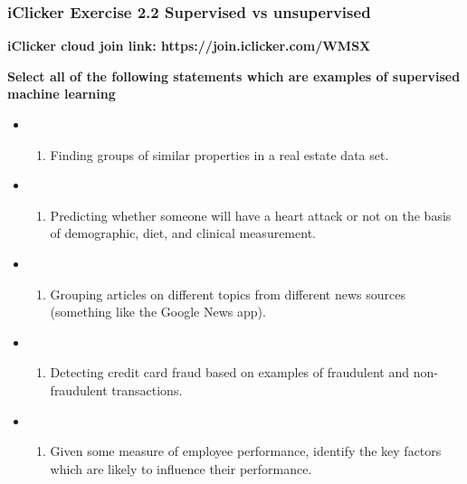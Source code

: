 \documentclass[11pt]{article}
\providecommand{\tightlist}{%
      \setlength{\itemsep}{0pt}\setlength{\parskip}{0pt}}
\begin{document}
    

    \subsubsection{iClicker Exercise 2.2 Supervised vs
unsupervised}\label{iclicker-exercise-2.2-supervised-vs-unsupervised}

\textbf{iClicker cloud join link: https://join.iclicker.com/WMSX}

\textbf{Select all of the following statements which are examples of
supervised machine learning}

\begin{itemize}
\tightlist
\item
  \begin{enumerate}
  \def\labelenumi{(\Alph{enumi})}
  \tightlist
  \item
    Finding groups of similar properties in a real estate data set.
  \end{enumerate}
\item
  \begin{enumerate}
  \def\labelenumi{(\Alph{enumi})}
  \setcounter{enumi}{1}
  \tightlist
  \item
    Predicting whether someone will have a heart attack or not on the
    basis of demographic, diet, and clinical measurement.
  \end{enumerate}
\item
  \begin{enumerate}
  \def\labelenumi{(\Alph{enumi})}
  \setcounter{enumi}{2}
  \tightlist
  \item
    Grouping articles on different topics from different news sources
    (something like the Google News app).
  \end{enumerate}
\item
  \begin{enumerate}
  \def\labelenumi{(\Alph{enumi})}
  \setcounter{enumi}{3}
  \tightlist
  \item
    Detecting credit card fraud based on examples of fraudulent and
    non-fraudulent transactions.
  \end{enumerate}
\item
  \begin{enumerate}
  \def\labelenumi{(\Alph{enumi})}
  \setcounter{enumi}{4}
  \tightlist
  \item
    Given some measure of employee performance, identify the key factors
    which are likely to influence their performance.
  \end{enumerate}
\end{itemize}
\end{document}
